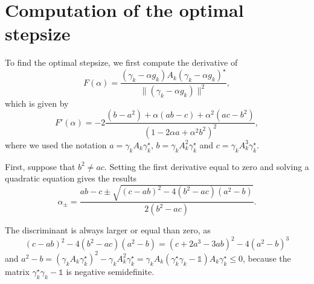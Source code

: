 \documentclass[11pt, onecolumn, journal,compsoc]{IEEEtran}
\newcommand{\id}{\mathds{1}}
\theoremstyle{plain}
\theoremstyle{remark}
\begin{document}
\appendix

\section{Computation of the optimal stepsize} \label{sec:CompAlpha}

To find the optimal stepsize, we first compute the derivative of \[F(\alpha) = \frac{(\gamma_k -\alpha g_k)A_k(\gamma_k - \alpha g_k)^\star}{\|(\gamma_k -\alpha g_k)\|^2},\]which is given by \[F'(\alpha) = -2\frac{(b-a^2)+\alpha(ab - c) + \alpha^2(ac-b^2)}{(1-2\alpha a +\alpha^2 b^2)^2},\] where we used the notation $a=\gamma_k A_k\gamma_k^\star$, $b=\gamma_k A_k^2\gamma_k^\star$ and $c=\gamma_k A_k^3\gamma_k^\star$.

First, suppose that $b^2 \neq ac$. Setting the first derivative equal to zero and solving a quadratic equation gives the results \begin{equation}\label{eq:alphaPM}\alpha_{\pm}  = \frac{ab-c\pm\sqrt{(c-ab)^2 - 4(b^2-ac)(a^2-b)}}{2(b^2-ac)}.\end{equation}

The discriminant is always larger or equal than zero, as \[(c-ab)^2 - 4(b^2-ac)(a^2-b) = (c+2a^3-3ab)^2 - 4(a^2-b)^3\] and $a^2 -b = (\gamma_k A_k \gamma_k^\star)^2 - \gamma_k A_k^2 \gamma_k^\star = \gamma_k A_k(\gamma_k^\star \gamma_k -\id)A_k \gamma_k^\star \leq0$, because the matrix $\gamma_k^\star\gamma_k -\id$ is negative semidefinite. 
\end{document}
